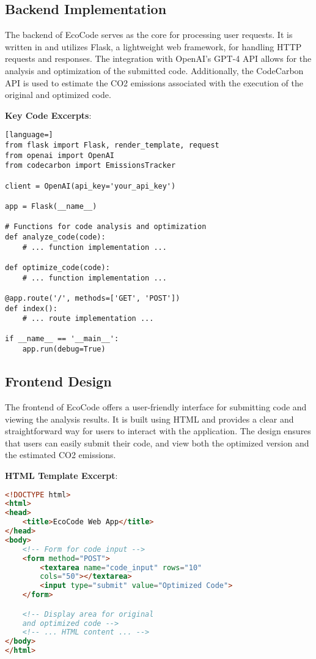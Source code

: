 \documentclass[conference,compsoc]{IEEEtran}
\begin{document}
\subsection{Backend Implementation}
The backend of EcoCode serves as the core for processing user requests. It is written in  and utilizes Flask, a lightweight web framework, for handling HTTP requests and responses. The integration with OpenAI's GPT-4 API allows for the analysis and optimization of the submitted  code. Additionally, the CodeCarbon API is used to estimate the CO2 emissions associated with the execution of the original and optimized code.

\textbf{Key Code Excerpts}:
\begin{lstlisting}[language=]
from flask import Flask, render_template, request
from openai import OpenAI
from codecarbon import EmissionsTracker

client = OpenAI(api_key='your_api_key')

app = Flask(__name__)

# Functions for code analysis and optimization
def analyze_code(code):
    # ... function implementation ...

def optimize_code(code):
    # ... function implementation ...

@app.route('/', methods=['GET', 'POST'])
def index():
    # ... route implementation ...

if __name__ == '__main__':
    app.run(debug=True)
\end{lstlisting}

\subsection{Frontend Design}
The frontend of EcoCode offers a user-friendly interface for submitting  code and viewing the analysis results. It is built using HTML and provides a clear and straightforward way for users to interact with the application. The design ensures that users can easily submit their code, and view both the optimized version and the estimated CO2 emissions.

\textbf{HTML Template Excerpt}:
\begin{lstlisting}[language=HTML]
<!DOCTYPE html>
<html>
<head>
    <title>EcoCode Web App</title>
</head>
<body>
    <!-- Form for code input -->
    <form method="POST">
        <textarea name="code_input" rows="10" 
        cols="50"></textarea>
        <input type="submit" value="Optimized Code">
    </form>

    <!-- Display area for original 
    and optimized code -->
    <!-- ... HTML content ... -->
</body>
</html>
\end{lstlisting}
\end{document}
